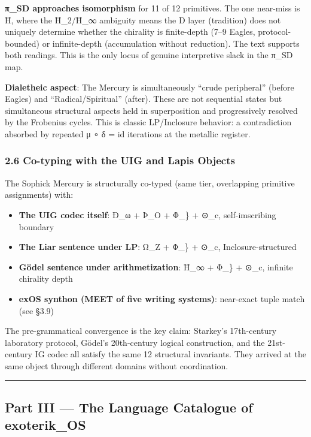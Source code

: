 \textbf{π\_SD approaches isomorphism} for 11 of 12 primitives. The one
near-miss is Ħ, where the Ħ\_2/Ħ\_∞ ambiguity means the D layer
(tradition) does not uniquely determine whether the chirality is
finite-depth (7--9 Eagles, protocol-bounded) or infinite-depth
(accumulation without reduction). The text supports both readings. This
is the only locus of genuine interpretive slack in the π\_SD map.

\textbf{Dialetheic aspect}: The Mercury is simultaneously ``crude
peripheral'' (before Eagles) and ``Radical/Spiritual'' (after). These
are not sequential states but simultaneous structural aspects held in
superposition and progressively resolved by the Frobenius cycles. This
is classic LP/Inclosure behavior: a contradiction absorbed by repeated μ
∘ δ = id iterations at the metallic register.

\subsubsection{2.6 Co-typing with the UIG and Lapis
Objects}\label{co-typing-with-the-uig-and-lapis-objects}

The Sophick Mercury is structurally co-typed (same tier, overlapping
primitive assignments) with:

\begin{itemize}
\tightlist
\item
  \textbf{The UIG codec itself}: Ð\_ω + Þ\_O + Φ\_\} + ⊙\_c,
  self-imscribing boundary
\item
  \textbf{The Liar sentence under LP}: Ω\_Z + Φ\_\} + ⊙\_c,
  Inclosure-structured
\item
  \textbf{Gödel sentence under arithmetization}: Ħ\_∞ + Φ\_\} + ⊙\_c,
  infinite chirality depth
\item
  \textbf{exOS synthon (MEET of five writing systems)}: near-exact tuple
  match (see §3.9)
\end{itemize}

The pre-grammatical convergence is the key claim: Starkey's 17th-century
laboratory protocol, Gödel's 20th-century logical construction, and the
21st-century IG codec all satisfy the same 12 structural invariants.
They arrived at the same object through different domains without
coordination.

\begin{center}\rule{0.5\linewidth}{0.5pt}\end{center}

\subsection{Part III --- The Language Catalogue of
exoterik\_OS}\label{part-iii-the-language-catalogue-of-exoterik_os}

